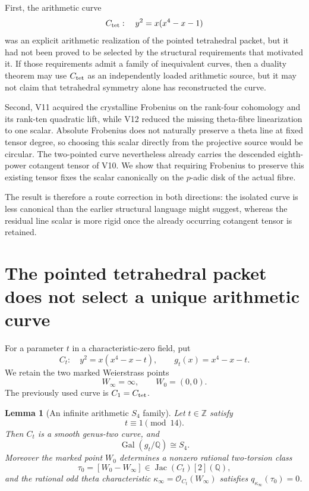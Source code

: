 \documentclass[11pt]{article}
\newtheorem{lemma}[lemma]{Lemma}
\theoremstyle{definition}
\theoremstyle{remark}
\begin{document}
First, the arithmetic curve
\[
 C_{\rm tet}:\quad y^2=x(x^4-x-1)
\]
was an explicit arithmetic realization of the pointed tetrahedral packet, but
it had not been proved to be selected by the structural requirements that
motivated it.  If those requirements admit a family of inequivalent curves,
then a duality theorem may use $C_{\rm tet}$ as an independently loaded
arithmetic source, but it may not claim that tetrahedral symmetry alone has
reconstructed the curve.

Second, V11 acquired the crystalline Frobenius on the rank-four cohomology and
its rank-ten quadratic lift, while V12 reduced the missing theta-fibre
linearization to one scalar.  Absolute Frobenius does not naturally preserve a
theta line at fixed tensor degree, so choosing this scalar directly from the
projective source would be circular.  The two-pointed curve nevertheless
already carries the descended eighth-power cotangent tensor of V10.  We show
that requiring Frobenius to preserve this existing tensor fixes the scalar
canonically on the $p$-adic disk of the actual fibre.

The result is therefore a route correction in both directions: the isolated
curve is less canonical than the earlier structural language might suggest,
whereas the residual line scalar is more rigid once the already occurring
cotangent tensor is retained.

\section{The pointed tetrahedral packet does not select a unique arithmetic curve}
\label{sec:v13-family}

For a parameter $t$ in a characteristic-zero field, put
\begin{equation}
 C_t:\quad y^2=x(x^4-x-t),
 \qquad g_t(x)=x^4-x-t.
 \label{eq:v13-family}
\end{equation}
We retain the two marked Weierstrass points
\[
 W_\infty=\infty,\qquad W_0=(0,0).
\]
The previously used curve is $C_1=C_{\rm tet}$.

\begin{lemma}[An infinite arithmetic $S_4$ family]
\label{lem:v13-S4-family}
Let $t\in\mathbb Z$ satisfy
\[
 t\equiv1\pmod{14}.
\]
Then $C_t$ is a smooth genus-two curve, and
\begin{equation}
 \boxed{\operatorname{Gal}(g_t/\mathbb Q)\cong S_4.}
 \label{eq:v13-S4}
\end{equation}
Moreover the marked point $W_0$ determines a nonzero rational two-torsion
class
\[
 \tau_0=[W_0-W_\infty]\in\operatorname{Jac}(C_t)[2](\mathbb Q),
\]
and the rational odd theta characteristic
$\kappa_\infty=\mathcal O_{C_t}(W_\infty)$ satisfies
$q_{\kappa_\infty}(\tau_0)=0$.
\end{lemma}
\end{document}
